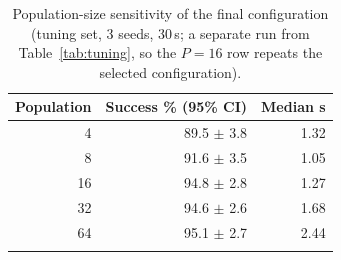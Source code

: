 \begin{table}[htbp]
\caption{Population-size sensitivity of the final configuration (tuning set, 3 seeds, 30\,s; a separate run from Table~\ref{tab:tuning}, so the $P=16$ row repeats the selected configuration).}
\label{tab:pop}
\begin{tabular}{rrr}
\toprule
Population & Success \% (95\% CI) & Median s \\
\midrule
4 & 89.5 $\pm$ 3.8 & 1.32 \\
8 & 91.6 $\pm$ 3.5 & 1.05 \\
16 & 94.8 $\pm$ 2.8 & 1.27 \\
32 & 94.6 $\pm$ 2.6 & 1.68 \\
64 & 95.1 $\pm$ 2.7 & 2.44 \\
\botrule
\end{tabular}
\end{table}
